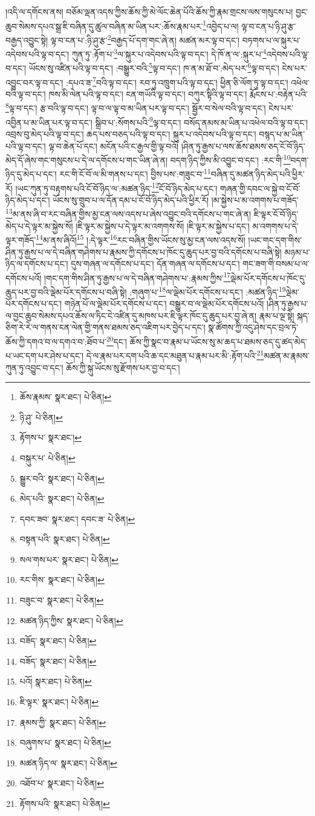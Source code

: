 །འདི་ལ་དགོངས་ནས། བཅོམ་ལྡན་འདས་ཀྱིས་ཆོས་ཀྱི་མེ་ལོང་ཆེན་པོའི་ཆོས་ཀྱི་རྣམ་གྲངས་ལས་གསུངས་པ། བྱང་ཆུབ་སེམས་དཔའ་སྒྲ་ཇི་བཞིན་དུ་ཚུལ་བཞིན་མ་ཡིན་པར་:ཆོས་རྣམ་པར་\footnote{ཆོས་རྣམས་  སྣར་ཐང་།  པེ་ཅིན། }འབྱེད་པ་ལ། ལྟ་བ་ངན་པ་ཉི་ཤུ་རྩ་བརྒྱད་འབྱུང་སྟེ། ལྟ་བ་ངན་པ་:ཉི་ཤུ་རྩ་\footnote{ཉི་ཤུ་  པེ་ཅིན། }བརྒྱད་པོ་དག་གང་ཞེ་ན། མཚན་མར་ལྟ་བ་དང་། བཏགས་པ་ལ་སྐུར་པ་འདེབས་པའི་ལྟ་བ་དང་། ཀུན་ཏུ་:རྟོག་པ་\footnote{རྟོགས་པ་  སྣར་ཐང་། }ལ་སྐུར་པ་འདེབས་པའི་ལྟ་བ་དང་། དེ་ཁོ་ན་ལ་:སྐུར་པ་\footnote{བསྐུར་པ་  པེ་ཅིན། }འདེབས་པའི་ལྟ་བ་དང་། ཡོངས་སུ་འཛིན་པའི་ལྟ་བ་དང་། :བསྒྱུར་བའི་\footnote{སྒྱུར་བའི་  སྣར་ཐང་།  པེ་ཅིན། }ལྟ་བ་དང་། ཁ་ན་མ་ཐོ་བ་:མེད་པར་\footnote{མེད་པའི་  སྣར་ཐང་།  པེ་ཅིན། }ལྟ་བ་དང་། ངེས་པར་འབྱུང་བར་ལྟ་བ་དང་། :དཔའ་ཟ་\footnote{དབང་ཟབ་  སྣར་ཐང་། དབང་ཟ་  པེ་ཅིན། }བའི་ལྟ་བ་དང་། རབ་ཏུ་འཁྲུག་པའི་ལྟ་བ་དང་། ཕྱིན་ཅི་ལོག་ཏུ་ལྟ་བ་དང་། འཕེལ་བའི་ལྟ་བ་དང་། ཁས་མི་ལེན་པའི་ལྟ་བ་དང་། ངན་གཡོའི་ལྟ་བ་དང་། བཀུར་སྟིའི་ལྟ་བ་དང་། རྨོངས་པ་:བརྟེན་པའི་\footnote{བསྟན་པའི་  སྣར་ཐང་།  པེ་ཅིན། }ལྟ་བ་དང་། རྩ་བའི་ལྟ་བ་དང་། ལྟ་བ་ལ་ལྟ་བ་མ་ཡིན་པར་ལྟ་བ་དང་། སྦྱོར་བ་སེལ་བའི་ལྟ་བ་དང་། ངེས་པར་འབྱིན་པ་མ་ཡིན་པར་ལྟ་བ་དང་། སྒྲིབ་པ་:སོགས་པའི་\footnote{སལ་གས་པར་  སྣར་ཐང་།  པེ་ཅིན། }ལྟ་བ་དང་། བསོད་ནམས་མ་ཡིན་པ་འཕེལ་བའི་ལྟ་བ་དང་། འབྲས་བུ་མེད་པའི་ལྟ་བ་དང་། ཆད་པས་བཅད་པའི་ལྟ་བ་དང་། སྐུར་པ་འདེབས་པའི་ལྟ་བ་དང་། བསྙད་པ་མ་ཡིན་པའི་ལྟ་བ་དང་། ལྟ་བ་ཆེན་པོ་དང་། མངོན་པའི་ང་རྒྱལ་གྱི་ལྟ་བའོ། །ཤིན་ཏུ་རྒྱས་པ་ལས་ཆོས་ཐམས་ཅད་ངོ་བོ་ཉིད་མེད་དོ་ཞེས་གང་གསུངས་པ་དེ་ལ་དགོངས་པ་གང་ཡིན་ཞེ་ན། བདག་ཉིད་ཀྱིས་མི་འབྱུང་བ་དང་། :རང་གི་\footnote{རང་གིས་  སྣར་ཐང་།  པེ་ཅིན། }བདག་ཉིད་དུ་མེད་པ་དང་། རང་གི་ངོ་བོ་ལ་མི་གནས་པ་དང་། བྱིས་པས་:གཟུང་བ་\footnote{བཟུང་བ་  སྣར་ཐང་།  པེ་ཅིན། }བཞིན་དུ་མཚན་ཉིད་མེད་པའི་ཕྱིར་རོ། །ཡང་ཀུན་ཏུ་བརྟགས་པའི་ངོ་བོ་ཉིད་ལ་:མཚན་ཉིད་\footnote{མཚན་ཉིད་ཀྱིས་  སྣར་ཐང་།  པེ་ཅིན། }ངོ་བོ་ཉིད་མེད་པ་དང་། གཞན་གྱི་དབང་ལ་སྐྱེ་བ་ངོ་བོ་ཉིད་མེད་པ་དང་། ཡོངས་སུ་གྲུབ་པ་ལ་དོན་དམ་པ་ངོ་བོ་ཉིད་མེད་པའི་ཕྱིར་རོ། །མ་སྐྱེས་པ་མ་འགགས་པ་གཟོད་\footnote{བཟོད་  སྣར་ཐང་།  པེ་ཅིན། }མ་ནས་ཞི་བ་རང་བཞིན་གྱིས་མྱ་ངན་ལས་འདས་པ་ཞེས་འབྱུང་བའི་དགོངས་པ་གང་ཞེ་ན། ཇི་ལྟར་ངོ་བོ་ཉིད་མེད་པ་དེ་ལྟར་མ་སྐྱེས་སོ། །ཇི་ལྟར་མ་སྐྱེས་པ་དེ་ལྟར་མ་འགགས་སོ། །ཇི་ལྟར་མ་སྐྱེས་པ་དང་། མ་འགགས་པ་དེ་ལྟར་གཟོད་\footnote{བཟོད་  སྣར་ཐང་།  པེ་ཅིན། }མ་ནས་ཞིའོ།\footnote{པའོ།  སྣར་ཐང་།  པེ་ཅིན། } །:དེ་ལྟར་\footnote{ཇི་ལྟར་  སྣར་ཐང་།  པེ་ཅིན། }རང་བཞིན་གྱིས་ཡོངས་སུ་མྱ་ངན་ལས་འདས་སོ། །ཡང་གང་དག་གིས་ཤིན་ཏུ་རྒྱས་པ་ལ་དེ་བཞིན་གཤེགས་པ་རྣམས་ཀྱི་དགོངས་པ་ཁོང་དུ་ཆུད་པར་བྱ་བའི་དགོངས་པ་བཞི་སྟེ། མཉམ་པ་ཉིད་ལ་དགོངས་པ་དང་། དུས་གཞན་ལ་དགོངས་པ་དང་། དོན་གཞན་ལ་དགོངས་པ་དང་། གང་ཟག་གི་བསམ་པ་ལ་དགོངས་པའོ། །གང་དག་གིས་ཤིན་ཏུ་རྒྱས་པ་ལ་དེ་བཞིན་གཤེགས་པ་:རྣམས་ཀྱིས་\footnote{རྣམས་ཀྱི་  སྣར་ཐང་།  པེ་ཅིན། }ལྡེམ་པོར་དགོངས་པ་ཁོང་དུ་ཆུད་པར་བྱ་བའི་ལྡེམ་པོར་དགོངས་པ་བཞི་སྟེ། :གཞུག་པ་\footnote{བཞུགས་པ་  སྣར་ཐང་།  པེ་ཅིན། }ལ་ལྡེམ་པོར་དགོངས་པ་དང་། :མཚན་ཉིད་\footnote{མཚན་ཉིད་ལ་  སྣར་ཐང་།  པེ་ཅིན། }ལྡེམ་པོར་དགོངས་པ་དང་། གཉེན་པོ་ལ་ལྡེམ་པོར་དགོངས་པ་དང་། བསྒྱུར་བ་ལ་ལྡེམ་པོར་དགོངས་པའོ། །ཤིན་ཏུ་རྒྱས་པ་ལ་བྱང་ཆུབ་སེམས་དཔའ་ཆོས་ལ་ཏིང་ངེ་འཛིན་དུ་མཁས་པར་ཇི་ལྟར་ཁོང་དུ་ཆུད་པར་བྱ་ཞེ་ན། རྣམ་པ་ལྔ་སྟེ། སྐད་ཅིག་རེ་རེ་ལ་གནས་ངན་ལེན་གྱི་གནས་ཐམས་ཅད་འཇིག་པར་བྱེད་པ་དང་། སྣ་ཚོགས་ཀྱི་འདུ་ཤེས་དང་བྲལ་ཏེ་ཆོས་ཀྱི་དགའ་བ་ལ་དགའ་བ་:ཐོབ་པ་\footnote{འཐོབ་པ་  སྣར་ཐང་།  པེ་ཅིན། }དང་། ཆོས་ཀྱི་སྣང་བ་རྣམ་པ་ཡོངས་སུ་མ་ཆད་པ་ཐམས་ཅད་དུ་ཚད་མེད་པ་ཡང་དག་པར་ཤེས་པ་དང་། དེ་ལ་རྣམ་པར་དག་པའི་ཆ་དང་མཐུན་པ་རྣམ་པར་མི་:རྟོག་པའི་\footnote{རྟོགས་པའི་  སྣར་ཐང་།  པེ་ཅིན། }མཚན་མ་རྣམས་ཀུན་ཏུ་འབྱུང་བ་དང་། ཆོས་ཀྱི་སྐུ་ཡོངས་སུ་རྫོགས་པར་བྱ་བ་དང་། 